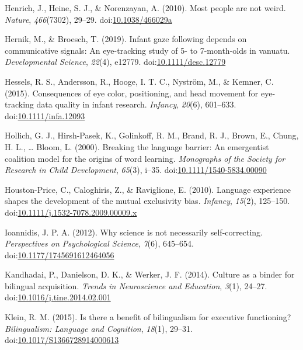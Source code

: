 \documentclass[,man,floatsintext]{apa6}
\begin{document}
\leavevmode\hypertarget{ref-Henrich_etal_2010}{}%
Henrich, J., Heine, S. J., \& Norenzayan, A. (2010). Most people are not weird. \emph{Nature}, \emph{466}(7302), 29--29. doi:\href{https://doi.org/10.1038/466029a}{10.1038/466029a}

\leavevmode\hypertarget{ref-Hernik_Broesch_2019}{}%
Hernik, M., \& Broesch, T. (2019). Infant gaze following depends on communicative signals: An eye-tracking study of 5- to 7-month-olds in vanuatu. \emph{Developmental Science}, \emph{22}(4), e12779. doi:\href{https://doi.org/10.1111/desc.12779}{10.1111/desc.12779}

\leavevmode\hypertarget{ref-Hessels_etal_2015}{}%
Hessels, R. S., Andersson, R., Hooge, I. T. C., Nyström, M., \& Kemner, C. (2015). Consequences of eye color, positioning, and head movement for eye-tracking data quality in infant research. \emph{Infancy}, \emph{20}(6), 601--633. doi:\href{https://doi.org/10.1111/infa.12093}{10.1111/infa.12093}

\leavevmode\hypertarget{ref-Hollich_etal_2000}{}%
Hollich, G. J., Hirsh-Pasek, K., Golinkoff, R. M., Brand, R. J., Brown, E., Chung, H. L., \ldots{} Bloom, L. (2000). Breaking the language barrier: An emergentist coalition model for the origins of word learning. \emph{Monographs of the Society for Research in Child Development}, \emph{65}(3), i--35. doi:\href{https://doi.org/10.1111/1540-5834.00090}{10.1111/1540-5834.00090}

\leavevmode\hypertarget{ref-Houston-Price_etal_2010}{}%
Houston-Price, C., Caloghiris, Z., \& Raviglione, E. (2010). Language experience shapes the development of the mutual exclusivity bias. \emph{Infancy}, \emph{15}(2), 125--150. doi:\href{https://doi.org/10.1111/j.1532-7078.2009.00009.x}{10.1111/j.1532-7078.2009.00009.x}

\leavevmode\hypertarget{ref-Ioannidis_2012}{}%
Ioannidis, J. P. A. (2012). Why science is not necessarily self-correcting. \emph{Perspectives on Psychological Science}, \emph{7}(6), 645--654. doi:\href{https://doi.org/10.1177/1745691612464056}{10.1177/1745691612464056}

\leavevmode\hypertarget{ref-Kandhadai_etal_2014}{}%
Kandhadai, P., Danielson, D. K., \& Werker, J. F. (2014). Culture as a binder for bilingual acquisition. \emph{Trends in Neuroscience and Education}, \emph{3}(1), 24--27. doi:\href{https://doi.org/10.1016/j.tine.2014.02.001}{10.1016/j.tine.2014.02.001}

\leavevmode\hypertarget{ref-Klein_2015}{}%
Klein, R. M. (2015). Is there a benefit of bilingualism for executive functioning? \emph{Bilingualism: Language and Cognition}, \emph{18}(1), 29--31. doi:\href{https://doi.org/10.1017/S1366728914000613}{10.1017/S1366728914000613}
\end{document}
